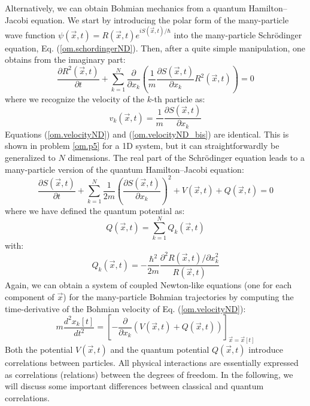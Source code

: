 \documentclass[nofootinbib, secnumarabic, amsmath, nobibnotes,11pt,aps,pra, floatfix]{revtex4-1}
\newcommand{\eref}[1]{Eq. (\ref{#1})}
\begin{document}
Alternatively, we can obtain Bohmian mechanics from a quantum Hamilton--Jacobi equation. We start by introducing the polar form of the many-particle wave function $\psi(\vec{x},t) = R(\vec{x},t) e^{i S(\vec{x},t)/\hbar}$ into the many-particle Schr\"odinger equation, \eref{om.schordingerND}. Then, after a quite simple manipulation, one obtains from the imaginary part:
\begin{equation}
\label{om.charge_conservationND}
\frac{\partial R^{2}(\vec{x},t)}{\partial t} + \sum_{k = 1}^{N} \frac {\partial } {\partial x_k} \left(\frac {1} {m} \frac {\partial S(\vec{x},t)}{\partial x_k} R^2(\vec{x},t) \right) = 0
\end{equation}
where we recognize the velocity of the $k$-th particle as:
\begin{equation}
\label{om.velocityND_bis}
v_k(\vec{x},t) = \frac {1} {m} \frac {\partial S(\vec{x},t)}{\partial x_k}
\end{equation}
Equations (\ref{om.velocityND}) and (\ref{om.velocityND_bis}) are
identical. This is shown in problem \ref{om.p5} for a 1D system, but
it can straightforwardly be generalized to $N$ dimensions. The real
part of the Schr\"odinger equation leads to a many-particle version
of the quantum Hamilton--Jacobi equation:
\begin{equation}
\label{om.Hamilton_JacobiND}
\frac{\partial S(\vec{x},t)}{\partial t} + \sum_{k = 1}^{N} \frac {1} {2 m} \left(\frac{{\partial} S(\vec{x},t)} {\partial x_k} \right)^2 + V(\vec{x},t) + Q(\vec{x},t) = 0 
\end{equation}
where we have defined the quantum potential as:
\begin{equation}
\label{om.quantum_potentialND_total}
Q(\vec{x},t) = \sum_{k = 1}^{N} Q_k(\vec{x},t)
\end{equation}
with:
\begin{equation}
\label{om.quantum_potentialND_parcial}
Q_k(\vec{x},t) = -\frac{\hbar^2} {2 m} \frac{{\partial}^2 R(\vec{x},t)/ \partial x^2_k} {R(\vec{x},t)}
\end{equation}
Again, we can obtain a system of coupled Newton-like equations (one for each component of $\vec{x}$) for the many-particle Bohmian trajectories by computing the time-derivative of the Bohmian velocity of \eref{om.velocityND}:
\begin{equation}
\label{om.NewtonlikeMP}
m\frac{d^2x_k[t]} {dt^2} = \left [-\frac{\partial} {\partial x_k} \left( V(\vec{x},t) + Q(\vec{x},t)\right)  \right ] _{\vec x = \vec x[t]}
\end{equation}
Both the potential $V(\vec{x},t)$ and the quantum potential
$Q(\vec{x},t)$ introduce correlations between particles. All
physical interactions are essentially expressed as correlations (relations)
between the degrees of freedom. In the following, we will discuss
some important differences between classical and quantum
correlations.
\end{document}
